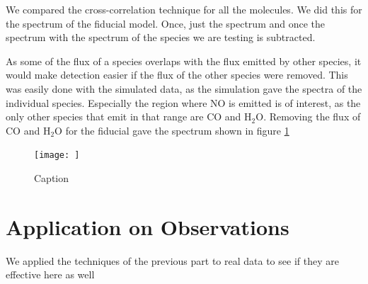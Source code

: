 \documentclass[twoside, single, authoryear, semicolon]{lion-msc}
\newcommand{\4}{$_4$}
\newcommand{\3}{$_3$}
\newcommand{\2}{$_2$}
\begin{document}
We compared the cross-correlation technique for all the molecules. We did this for the spectrum of the fiducial model. Once, just the spectrum and once the spectrum with the spectrum of the species we are testing is subtracted.








As some of the flux of a species overlaps with the flux emitted by other species, it would make detection easier if the flux of the other species were removed. This was easily done with the simulated data, as the simulation gave the spectra of the individual species. Especially the region where NO is emitted is of interest, as the only other species that emit in that range are CO and H\2O. Removing the flux of CO and H\2O for the fiducial gave the spectrum shown in figure \ref{}

\begin{figure}
    \centering
    \texttt{[image: ]}
    \caption{Caption}
    \label{fig:enter-label}
\end{figure}

\section{Application on Observations}
We applied the techniques of the previous part to real data to see if they are effective here as well
\end{document}
